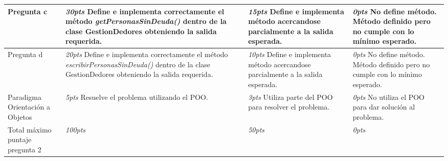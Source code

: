 \documentclass{article}
\begin{document}
\begin{table}[!ht]
{\begin{center}
\begin{tabular}{|p{4cm}|p{4cm}|p{4cm}|p{4cm}|}
							Pregunta c &
							\emph{30pts} Define e implementa correctamente el m\'etodo \emph{getPersonasSinDeuda()}  dentro de la clase GestionDedores obteniendo la salida requerida.&
							\emph{15pts} Define e implementa m\'etodo acercandose parcialmente a la salida esperada.  &
							\emph{ 0pts} No define m\'etodo.  M\'etodo definido pero no cumple con lo m\'inimo esperado. \\ \hline

							Pregunta d &
							\emph{20pts} Define e implementa correctamente el m\'etodo \emph{escribirPersonasSinDeuda()}  dentro de la clase GestionDedores obteniendo la salida requerida.&
							\emph{10pts} Define e implementa m\'etodo acercandose parcialmente a la salida esperada.  &
							\emph{ 0pts} No define m\'etodo.  M\'etodo definido pero no cumple con lo m\'inimo esperado. \\ \hline

							Paradigma Orientaci\'on a Objetos  &
							\emph{5pts} Resuelve el problema utilizando el POO. &
							\emph{3pts} Utiliza parte del POO para resolver el problema. &
							\emph{0pts} No utiliza el POO para dar soluci\'on al problema.\\ \hline
							Total m\'aximo puntaje pregunta 2 &
							\emph{100pts} &
							\emph{50pts} &
							\emph{  0pts} \\ \hline
					\end{tabular}
			\end{center}}
	 \end{table}
\end{document}
